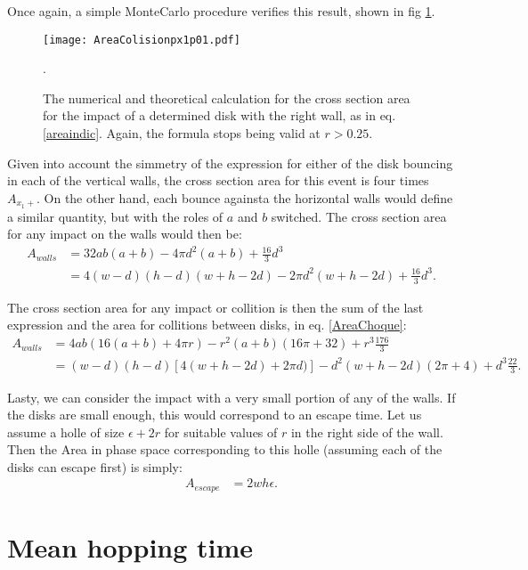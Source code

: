 \documentclass[a4paper,10pt, jcp, aps, preprint]{revtex4-1}
\begin{document}
Once again, a simple MonteCarlo procedure verifies this result,
shown in fig \ref{area1derecha}. 


\begin{figure}
\centering
\texttt{[image: AreaColisionpx1p01.pdf]}
\caption{The numerical and theoretical calculation for the cross section area
for the impact of a determined disk with the right wall, as in eq. \ref{areaindic}.
Again, the formula stops being valid at $r>0.25$. }
\label{area1derecha}.
\end{figure}


Given into account the simmetry of the expression for either of 
the disk bouncing in each of the vertical walls, the
cross section area for this event is four times $A_{x_1+}$. On
the other hand, each bounce againsta the horizontal walls would
define a similar quantity, but with the roles of $a$ and $b$ switched.
The cross section area for any impact on the walls would then be:
\begin{align}\label{areawalls}
 A_{walls} & = 32 a b (a+b)-4 \pi d^2 (a+b) +\frac{16}{3}d^3 \\
 &=  4 (w-d) (h-d)  (w+h-2d) -2 \pi d^2 (w + h-2 d) +\frac{16}{3}d^3. 
\end{align}

The cross section area for any impact or collition 
is then  the sum of the last expression
and the area for collitions between disks, in eq. \ref{AreaChoque}:
\begin{align}\label{areatotal}
 A_{walls} &= 4 a b (16(a+b) + 4\pi r)-r^2 (a+b)(16\pi+32)+r^3\frac{176}{3} \\ 
& = (w-d)(h-d)[4(w+h-2d)+2\pi d)]-d^2(w+h-2d)(2\pi+4)+d^3 \frac{22}{3}.
\end{align}

Lasty, we can consider the impact with a very small portion of any of the
walls. If the disks are small enough, this would correspond to an escape time. 
Let us assume a holle of size $\epsilon+2r$ for suitable values of $r$ in
the right side of the wall. Then the Area in phase space corresponding
to this holle (assuming each of the disks can escape first) is simply:
\begin{align}\label{escape}
 A_{escape} &= 2 w h \epsilon.
\end{align}



\section{Mean hopping time}
\end{document}
